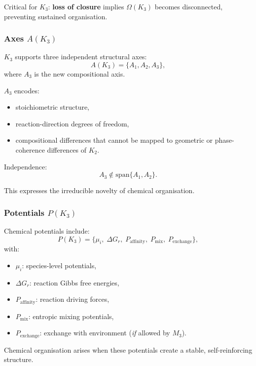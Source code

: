 Critical for $K_3$:
\textbf{loss of closure} implies $\Omega(K_3)$ becomes disconnected,
preventing sustained organisation.

\subsubsection{Axes \texorpdfstring{$A(K_3)$}{A(K_3)}}

$K_3$ supports three independent structural axes:
\[
A(K_3) = \{A_1, A_2, A_3\},
\]
where $A_3$ is the new compositional axis.

$A_3$ encodes:
\begin{itemize}
    \item stoichiometric structure,
    \item reaction-direction degrees of freedom,
    \item compositional differences that cannot be mapped to geometric
          or phase-coherence differences of $K_2$.
\end{itemize}

Independence:
\[
A_3 \notin \mathrm{span}\{A_1,A_2\}.
\]

This expresses the irreducible novelty of chemical organisation.

\subsubsection{Potentials \texorpdfstring{$P(K_3)$}{P(K_3)}}

Chemical potentials include:
\[
P(K_3) = \{ \mu_i,\; \Delta G_r,\; P_{\mathrm{affinity}},\;
           P_{\mathrm{mix}},\; P_{\mathrm{exchange}}\},
\]
with:
\begin{itemize}
    \item $\mu_i$: species-level potentials,
    \item $\Delta G_r$: reaction Gibbs free energies,
    \item $P_{\mathrm{affinity}}$: reaction driving forces,
    \item $P_{\mathrm{mix}}$: entropic mixing potentials,
    \item $P_{\mathrm{exchange}}$: exchange with environment (\emph{if}
          allowed by $M_3$).
\end{itemize}

Chemical organisation arises when these potentials create a stable,
self-reinforcing structure.

